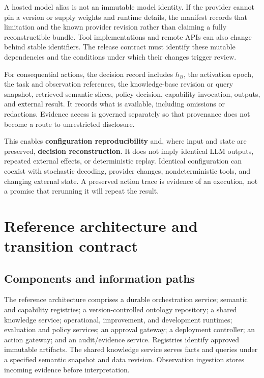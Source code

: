 \documentclass[preprint,12pt,authoryear]{elsarticle}
\begin{document}
A hosted model alias is not an immutable model identity. If the provider
cannot pin a version or supply weights and runtime details, the manifest
records that limitation and the known provider revision rather than
claiming a fully reconstructible bundle. Tool implementations and remote
APIs can also change behind stable identifiers. The release contract
must identify these mutable dependencies and the conditions under which
their changes trigger review.

For consequential actions, the decision record includes \(h_B\), the
activation epoch, the task and observation references, the
knowledge-base revision or query snapshot, retrieved semantic slices,
policy decision, capability invocation, outputs, and external result. It
records what is available, including omissions or redactions. Evidence
access is governed separately so that provenance does not become a route
to unrestricted disclosure.

This enables \textbf{configuration reproducibility} and, where input and
state are preserved, \textbf{decision reconstruction}. It does not imply
identical LLM outputs, repeated external effects, or deterministic
replay. Identical configuration can coexist with stochastic decoding,
provider changes, nondeterministic tools, and changing external state. A
preserved action trace is evidence of an execution, not a promise that
rerunning it will repeat the result.

\section{Reference architecture and transition
contract}\label{reference-architecture-and-transition-contract}

\subsection{Components and information
paths}\label{components-and-information-paths}

The reference architecture comprises a durable orchestration service;
semantic and capability registries; a version-controlled ontology
repository; a shared knowledge service; operational, improvement, and
development runtimes; evaluation and policy services; an approval
gateway; a deployment controller; an action gateway; and an
audit/evidence service. Registries identify approved immutable
artifacts. The shared knowledge service serves facts and queries under a
specified semantic snapshot and data revision. Observation ingestion
stores incoming evidence before interpretation.
\end{document}
